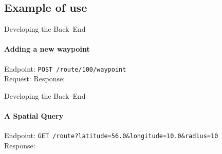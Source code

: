     \subsection{Example of use}
        \begin{frame}{Developing the Back--End}\framesubtitle{Adding a new waypoint}
            Endpoint: \texttt{POST /route/100/waypoint} 
            \\
            Request:
            \bigskip
            Response:
        \end{frame}

        \begin{frame}{Developing the Back--End}\framesubtitle{A Spatial Query}
            Endpoint: \texttt{GET /route?latitude=56.0\&longitude=10.0\&radius=10}
            \\
            Response:
        \end{frame}
